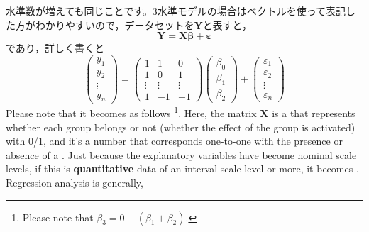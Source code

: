 \documentclass{ltjsbook}
\begin{document}
水準数が増えても同じことです。3水準モデルの場合はベクトルを使って表記した方がわかりやすいので，データセットを$\bm{Y}$と表すと，
\begin{equation}
	\bm{Y}=\bm{X\beta}+\bm{\varepsilon}
	\label{chap24eq1}
\end{equation}
であり，詳しく書くと
\[
	\begin{pmatrix} y_1 \\ y_2 \\ \vdots \\ y_n \end{pmatrix}
	=
	\begin{pmatrix} 1      & 1      & 0      \\
                1      & 0      & 1      \\
                \vdots & \vdots & \vdots \\
                1      & -1     & -1\end{pmatrix}
	\begin{pmatrix} \beta_0 \\ \beta_1 \\ \beta_2 \end{pmatrix}
	+
	\begin{pmatrix} \varepsilon_1 \\ \varepsilon_2 \\ \vdots \\ \varepsilon_n \end{pmatrix}
\]
Please note that it becomes as follows \footnote{Please note that $\beta_3 = 0 - (\beta_1 + \beta_2)$.}. Here, the matrix $\bm{X}$ is a  that represents whether each group belongs or not (whether the effect of the group is activated) with 0/1, and it's a number that corresponds one-to-one with the presence or absence of a . Just because the explanatory variables have become nominal scale levels, if this is \textbf{quantitative} data of an interval scale level or more, it becomes . Regression analysis is generally,
\end{document}
